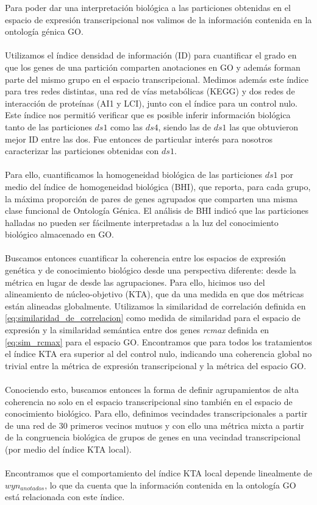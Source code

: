 Para poder dar una interpretación biológica a las particiones obtenidas en el espacio de expresión transcripcional nos valimos de la información contenida en la ontología génica GO.\\\\
Utilizamos el índice densidad de información (ID) para cuantificar el grado en que los genes de una partición comparten anotaciones en GO y además forman parte del mismo grupo en el espacio transcripcional. Medimos además este índice para tres redes distintas, una red de vías metabólicas (KEGG) y dos redes de interacción de proteínas (AI1 y LCI), junto con el índice para un control nulo. Este índice nos permitió verificar que es posible inferir información biológica tanto de las particiones $ds1$ como las $ds4$, siendo las de $ds1$ las que obtuvieron mejor ID entre las dos. Fue entonces de particular interés para nosotros caracterizar las particiones obtenidas con $ds1$.\\\\
Para ello, cuantificamos la homogeneidad biológica de las particiones $ds1$ por medio del índice de homogeneidad biológica (BHI), que reporta, para cada grupo, la máxima proporción de pares de genes agrupados que comparten una misma clase funcional de Ontología Génica. El análisis de BHI indicó que las particiones halladas no pueden ser fácilmente interpretadas a la luz del conocimiento biológico almacenado en GO.\\\\
Buscamos entonces cuantificar la coherencia entre los espacios de expresión genética y de conocimiento biológico desde una perspectiva diferente: desde la métrica en lugar de desde las agrupaciones. Para ello, hicimos uso del alineamiento de núcleo-objetivo (KTA), que da una medida en que dos métricas están alineadas globalmente. Utilizamos la similaridad de correlación definida en \ref{eq:similaridad_de_correlacion} como medida de similaridad para el espacio de expresión y la similaridad semántica entre dos genes \textit{rcmax} definida en \ref{eq:sim_rcmax} para el espacio GO. Encontramos que para todos los tratamientos el índice KTA era superior al del control nulo, indicando una coherencia global no trivial entre la métrica de expresión transcripcional y la métrica del espacio GO.\\\\
Conociendo esto, buscamos entonces la forma de definir agrupamientos de alta coherencia no solo en el espacio transcripcional sino también en el espacio de conocimiento biológico. Para ello, definimos vecindades transcripcionales a partir de una red de 30 primeros vecinos mutuos y con ello una métrica mixta a partir de la congruencia biológica de grupos de genes en una vecindad transcripcional (por medio del índice KTA local).\\\\ Encontramos que el comportamiento del índice KTA local depende linealmente de $wyn_{anotados}$, lo que da cuenta que la información contenida en la ontología GO está relacionada con este índice.\\\\
